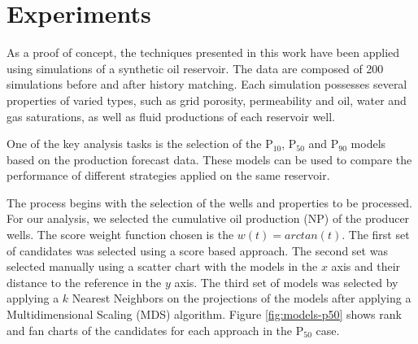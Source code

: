 \documentclass{sigchi-ext}
\begin{document}
\section{Experiments}
\label{sec:experiments}
As a proof of concept, the techniques presented in this work have been applied using simulations of a synthetic oil reservoir. The data are composed of 200 simulations before and after history matching. Each simulation possesses several properties of varied types, such as grid porosity, permeability and oil, water and gas saturations, as well as fluid productions of each reservoir well.

One of the key analysis tasks is the selection of the P$_{10}$, P$_{50}$ and P$_{90}$ models based on the production forecast data. These models can be used to compare the performance of different strategies applied on the same reservoir.

The process begins with the selection of the wells and properties to be processed. For our analysis, we selected the cumulative oil production (NP) of the producer wells. The score weight function chosen is the $w(t) = arctan(t)$. The first set of candidates was selected using a score based approach. The second set was selected manually using a scatter chart with the models in the $x$ axis and their distance to the reference in the $y$ axis. The third set of models was selected by applying a $k$ Nearest Neighbors on the projections of the models after applying a Multidimensional Scaling (MDS) algorithm. Figure \ref{fig:models-p50} shows rank and fan charts of the candidates for each approach in the P$_{50}$ case.
\end{document}
